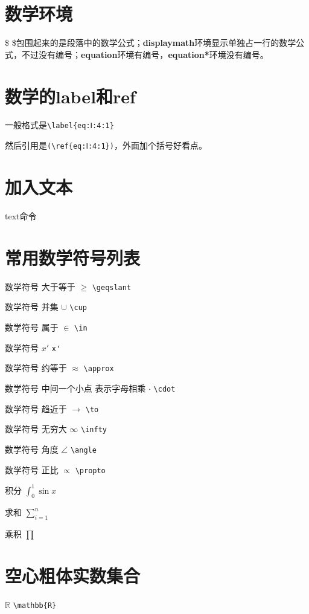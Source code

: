 \documentclass[11pt,oneside]{book}
\begin{document}
\begin{common-format}
\mainmatter

\section{数学环境}
\$ \$包围起来的是段落中的数学公式；\textbf{displaymath}环境显示单独占一行的数学公式，不过没有编号；\textbf{equation}环境有编号，\textbf{equation*}环境没有编号。

\section{数学的label和ref}
一般格式是\verb+\label{eq:Ⅰ:4:1}+

然后引用是\verb+(\ref{eq:Ⅰ:4:1})+，外面加个括号好看点。


\section{加入文本}
text命令

\section{常用数学符号列表}
数学符号 大于等于 $\geqslant$  \verb+\geqslant+

数学符号 并集 $\cup$  \verb+\cup+

数学符号 属于  $\in$  \verb+\in+

数学符号 $x'$  \verb+x'+

数学符号 约等于  $\approx$ \verb+\approx+

数学符号 中间一个小点 表示字母相乘 $\cdot$  \verb+\cdot+

数学符号 趋近于  $\to$ \verb+\to+

数学符号 无穷大 $\infty$  \verb+\infty+

数学符号 角度 $\angle$ \verb+\angle+

数学符号  正比  $\propto$ \verb+\propto+

积分 $\int_{0}^{1}\sin x$

求和 $\sum_{i=1}^{n}$

乘积 $\prod$





\section{空心粗体实数集合}
$\mathbb{R}$  \verb+\mathbb{R}+


\end{common-format}
\end{document}
